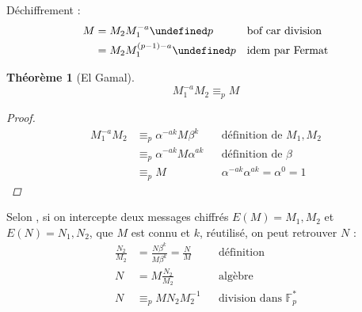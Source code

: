 \documentclass[11pt,twocolumn]{article}
\let\mod\undefined
\DeclareMathOperator{\mod}{mod}
\theoremstyle{plain}
\newtheorem{thm}{Théorème}
\newcommand{\esF}{\mathbb{F}} %
\begin{document}
Déchiffrement :
\begin{align*}
	M &= M_2 M_1^{-a} \mod p && \text{bof car division} \\
	&= M_2 M_1^{(p-1)-a} \mod p && \text{idem par Fermat}
\end{align*}

\begin{thm}[El Gamal]
	\[
		M_1^{-a}M_2 \equiv_p M
	\]
	\begin{proof}
		\begin{align*}
			M_1^{-a}M_2
			&\equiv_p \alpha^{-ak}M\beta^k && \text{définition de } M_1, M_2 \\
			&\equiv_p \alpha^{-ak}M\alpha^{ak} && \text{définition de } \beta \\
			&\equiv_p M && \alpha^{-ak}\alpha^{ak}=\alpha^0=1
		\end{align*}
	\end{proof}
\end{thm}

Selon \cite[p. 296]{hac}, si on intercepte deux messages chiffrés
$E(M)=M_1,M_2$ et $E(N)=N_1,N_2$, que $M$ est connu et $k$, réutilisé,
on peut retrouver $N$ :
\begin{align*}
	\frac{N_2}{M_2} &= \frac{N\beta^k}{M\beta^k} = \frac NM
		&& \text{définition} \\
	N &= M\frac{N_2}{M_2}
		&& \text{algèbre} \\
	N &\equiv_p MN_2M_2^{-1}
		&& \text{division dans }\esF_p^*
\end{align*}




\end{document}
